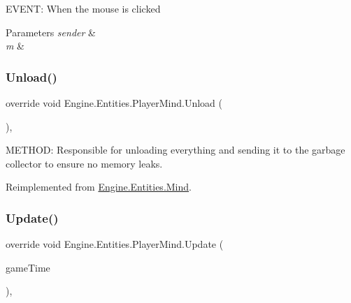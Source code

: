 E\+V\+E\+NT\+: When the mouse is clicked 


\begin{DoxyParams}{Parameters}
{\em sender} & \\
\hline
{\em m} & \\
\hline
\end{DoxyParams}
\mbox{\label{a00326_a80bacdc33e51129afed33f9e8bd5cd0f}} 
\subsubsection{\texorpdfstring{Unload()}{Unload()}}
{\footnotesize\ttfamily override void Engine.\+Entities.\+Player\+Mind.\+Unload (\begin{DoxyParamCaption}{ }\end{DoxyParamCaption})\hspace{0.3cm}{\ttfamily [inline]}, {\ttfamily [virtual]}}



M\+E\+T\+H\+OD\+: Responsible for unloading everything and sending it to the garbage collector to ensure no memory leaks. 



Reimplemented from \hyperlink{a00318_a15bf25a4a74706ef37592689f43c0598}{Engine.\+Entities.\+Mind}.

\mbox{\label{a00326_a172dca0ea26dfd821b413f7592a98084}} 
\subsubsection{\texorpdfstring{Update()}{Update()}}
{\footnotesize\ttfamily override void Engine.\+Entities.\+Player\+Mind.\+Update (\begin{DoxyParamCaption}\item[{Game\+Time}]{game\+Time }\end{DoxyParamCaption})\hspace{0.3cm}{\ttfamily [inline]}, {\ttfamily [virtual]}}



